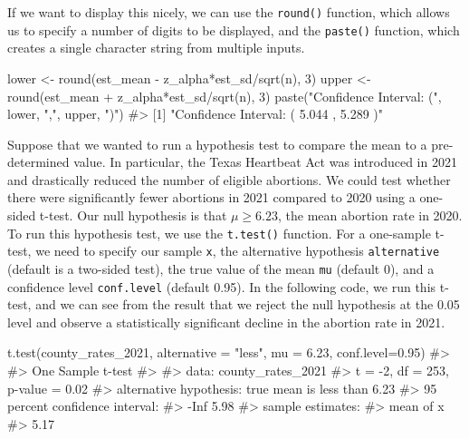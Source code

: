 \documentclass[
  letterpaper,
]{latex/krantz}
\makeatletter
\newenvironment{Shaded}{\begin{snugshade}}{\end{snugshade}}
\newcommand{\AttributeTok}[1]{\textcolor[rgb]{0.40,0.45,0.13}{#1}}
\newcommand{\CommentTok}[1]{\textcolor[rgb]{0.37,0.37,0.37}{#1}}
\newcommand{\DecValTok}[1]{\textcolor[rgb]{0.68,0.00,0.00}{#1}}
\newcommand{\FloatTok}[1]{\textcolor[rgb]{0.68,0.00,0.00}{#1}}
\newcommand{\FunctionTok}[1]{\textcolor[rgb]{0.28,0.35,0.67}{#1}}
\newcommand{\NormalTok}[1]{\textcolor[rgb]{0.00,0.23,0.31}{#1}}
\newcommand{\OtherTok}[1]{\textcolor[rgb]{0.00,0.23,0.31}{#1}}
\newcommand{\SpecialCharTok}[1]{\textcolor[rgb]{0.37,0.37,0.37}{#1}}
\newcommand{\StringTok}[1]{\textcolor[rgb]{0.13,0.47,0.30}{#1}}
\newenvironment{kframe}{%
\medskip{}
\setlength{\fboxsep}{.8em}
 \def\at@end@of@kframe{}%
 \ifinner\ifhmode%
  \def\at@end@of@kframe{\end{minipage}}%
  \begin{minipage}{\columnwidth}%
 \fi\fi%
 \def\FrameCommand##1{\hskip\@totalleftmargin \hskip-\fboxsep
 \colorbox{shadecolor}{##1}\hskip-\fboxsep
     \hskip-\linewidth \hskip-\@totalleftmargin \hskip\columnwidth}%
 \MakeFramed {\advance\hsize-\width
   \@totalleftmargin\z@ \linewidth\hsize
   \@setminipage}}%
 {\par\unskip\endMakeFramed%
 \at@end@of@kframe}
\renewenvironment{Shaded}{\begin{kframe}}{\end{kframe}}
\makeatother
\begin{document}
If we want to display this nicely, we can use the \texttt{round()}
function, which allows us to specify a number of digits to be displayed,
and the \texttt{paste()}
function, which creates a
single character string from multiple inputs.

\begin{Shaded}
\begin{Highlighting}[]
\NormalTok{lower }\OtherTok{\textless{}{-}} \FunctionTok{round}\NormalTok{(est\_mean }\SpecialCharTok{{-}}\NormalTok{ z\_alpha}\SpecialCharTok{*}\NormalTok{est\_sd}\SpecialCharTok{/}\FunctionTok{sqrt}\NormalTok{(n), }\DecValTok{3}\NormalTok{)}
\NormalTok{upper }\OtherTok{\textless{}{-}} \FunctionTok{round}\NormalTok{(est\_mean }\SpecialCharTok{+}\NormalTok{ z\_alpha}\SpecialCharTok{*}\NormalTok{est\_sd}\SpecialCharTok{/}\FunctionTok{sqrt}\NormalTok{(n), }\DecValTok{3}\NormalTok{)}
\FunctionTok{paste}\NormalTok{(}\StringTok{"Confidence Interval: ("}\NormalTok{, lower, }\StringTok{","}\NormalTok{, upper, }\StringTok{")"}\NormalTok{)}
\CommentTok{\#\textgreater{} [1] "Confidence Interval: ( 5.044 , 5.289 )"}
\end{Highlighting}
\end{Shaded}

Suppose that we wanted to run a hypothesis test to compare the mean to a
pre-determined value. In particular, the Texas Heartbeat Act was
introduced in 2021 and drastically reduced the number of eligible
abortions. We could test whether there were significantly fewer
abortions in 2021 compared to 2020 using a one-sided t-test. Our null
hypothesis is that \(\mu \geq 6.23\), the mean abortion rate in 2020. To
run this hypothesis test, we use the \texttt{t.test()}
 function. For a
one-sample t-test, we need to specify our sample \texttt{x}, the
alternative hypothesis \texttt{alternative} (default is a two-sided
test), the true value of the mean \texttt{mu} (default 0), and a
confidence level \texttt{conf.level} (default 0.95). In the following
code, we run this t-test, and we can see from the result that we reject
the null hypothesis at the 0.05 level and observe a statistically
significant decline in the abortion rate in 2021.

\begin{Shaded}
\begin{Highlighting}[]
\FunctionTok{t.test}\NormalTok{(county\_rates\_2021, }\AttributeTok{alternative =} \StringTok{"less"}\NormalTok{, }\AttributeTok{mu =} \FloatTok{6.23}\NormalTok{, }
       \AttributeTok{conf.level=}\FloatTok{0.95}\NormalTok{)}
\CommentTok{\#\textgreater{} }
\CommentTok{\#\textgreater{}  One Sample t{-}test}
\CommentTok{\#\textgreater{} }
\CommentTok{\#\textgreater{} data:  county\_rates\_2021}
\CommentTok{\#\textgreater{} t = {-}2, df = 253, p{-}value = 0.02}
\CommentTok{\#\textgreater{} alternative hypothesis: true mean is less than 6.23}
\CommentTok{\#\textgreater{} 95 percent confidence interval:}
\CommentTok{\#\textgreater{}  {-}Inf 5.98}
\CommentTok{\#\textgreater{} sample estimates:}
\CommentTok{\#\textgreater{} mean of x }
\CommentTok{\#\textgreater{}      5.17}
\end{Highlighting}
\end{Shaded}
\end{document}
